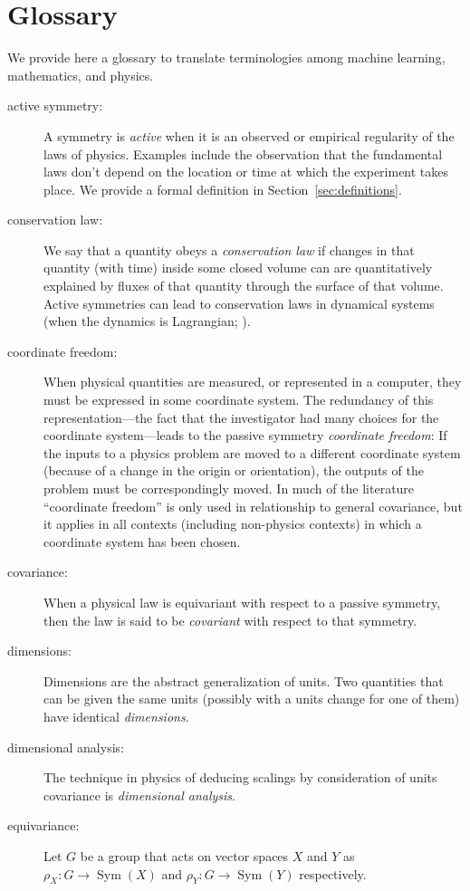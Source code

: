 \documentclass[]{article} %
\newcommand{\sectionname}{Section}
\newcommand{\secref}[1]{\sectionname~\ref{#1}}
\begin{document}
\section{Glossary}\label{app:glossary}
We provide here a glossary to translate terminologies among machine learning, mathematics, and physics.
\begin{description}
\item[active symmetry:]
  A symmetry is \emph{active} when it is an observed or empirical regularity of the laws of physics.
  Examples include the observation that the fundamental laws don't depend on the location or time at which the experiment takes place.
  We provide a formal definition in \secref{sec:definitions}.
\item[conservation law:]
  We say that a quantity obeys a \emph{conservation law} if changes in that quantity (with time) inside some closed volume can are quantitatively explained by fluxes of that quantity through the surface of that volume.
  Active symmetries can lead to conservation laws in dynamical systems (when the dynamics is Lagrangian; \citealt{noether}).
\item[coordinate freedom:]
  When physical quantities are measured, or represented in a computer, they must be expressed in some coordinate system.
  The redundancy of this representation---the fact that the investigator had many choices for the coordinate system---leads to the passive symmetry \emph{coordinate freedom}:
  If the inputs to a physics problem are moved to a different coordinate system (because of a change in the origin or orientation), the outputs of the problem must be correspondingly moved.
  In much of the literature ``coordinate freedom'' is only used in relationship to general covariance, but it applies in all contexts (including non-physics contexts) in which a coordinate system has been chosen.
\item[covariance:]
  When a physical law is equivariant with respect to a passive symmetry, then the law is said to be \emph{covariant} with respect to that symmetry.
\item[dimensions:]
  Dimensions are the abstract generalization of units.
  Two quantities that can be given the same units (possibly with a units change for one of them) have identical \emph{dimensions}.
\item[dimensional analysis:]
  The technique in physics of deducing scalings by consideration of units covariance is \emph{dimensional analysis}.
\item[equivariance:]
  Let $G$ be a group that acts on vector spaces $X$ and $Y$ as $\rho_X:G\to \operatorname{Sym}(X)$ and $\rho_Y:G\to \operatorname{Sym}(Y)$ respectively.

\end{description}
\end{document}
